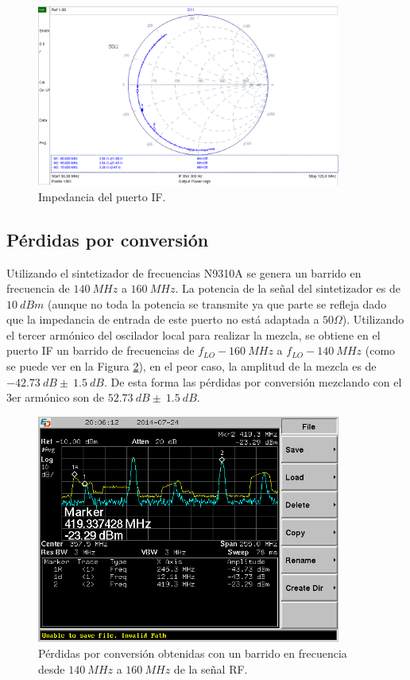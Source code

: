 \documentclass[a4paper,10pt]{article}
\begin{document}
	\begin{figure}[!htb]
		\centering
		\includegraphics[width=10cm]{Images/impedanciaIF.png}
		\caption{Impedancia del puerto IF.}
		\label{impedancia3}
	\end{figure}			
	
	\subsection{P\'erdidas por conversi\'on}
	\indent Utilizando el sintetizador de frecuencias N9310A se genera un 
	barrido en frecuencia de $140~MHz$ a $160~MHz$. La potencia de la se\~nal 
	del sintetizador es de $10~dBm$ (aunque no toda la potencia se transmite ya 
	que parte se refleja dado que la impedancia de entrada de este puerto no 
	est\'a adaptada a $50\Omega$). Utilizando el tercer arm\'onico del oscilador
	local para realizar la mezcla, se obtiene en el puerto IF un barrido de 
	frecuencias de $f_{LO}-160~MHz$ a $f_{LO}-140~MHz$ (como se puede ver en la 
	Figura \ref{perdidas}), en el peor caso, la amplitud de la mezcla es de 
	$-42.73~dB\pm~1.5~dB$. De esta forma las p\'erdidas por conversi\'on 
	mezclando con el 3er arm\'onico son de $52.73~dB\pm~1.5~dB$.
	
	\begin{figure}[!htb]
		\centering
		\includegraphics[width=10cm]{Images/SCREN538.png}
		\caption{P\'erdidas por conversi\'on obtenidas con un barrido en 
		frecuencia desde $140~MHz$ a $160~MHz$ de la se\~nal RF.}
		\label{perdidas}
	\end{figure}	
	
\end{document}
